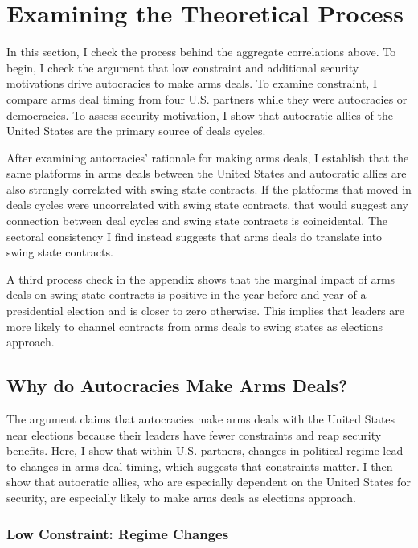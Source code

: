 \documentclass[12pt]{article}
\begin{document}
\section{Examining the Theoretical Process}


In this section, I check the process behind the aggregate correlations above.  
To begin, I check the argument that low constraint and additional security motivations drive autocracies to make arms deals.
To examine constraint, I compare arms deal timing from four U.S. partners while they were autocracies or democracies.
To assess security motivation, I show that autocratic allies of the United States are the primary source of deals cycles. 


After examining autocracies' rationale for making arms deals, I establish that the same platforms in arms deals between the United States and autocratic allies are also strongly correlated with swing state contracts.
If the platforms that moved in deals cycles were uncorrelated with swing state contracts, that would suggest any connection between deal cycles and swing state contracts is coincidental.
The sectoral consistency I find instead suggests that arms deals do translate into swing state contracts.


A third process check in the appendix shows that the marginal impact of arms deals on swing state contracts is positive in the year before and year of a presidential election and is closer to zero otherwise.
This implies that leaders are more likely to channel contracts from arms deals to swing states as elections approach. 



\subsection{Why do Autocracies Make Arms Deals?}


The argument claims that autocracies make arms deals with the United States near elections because their leaders have fewer constraints and reap security benefits. 
Here, I show that within U.S. partners, changes in political regime lead to changes in arms deal timing, which suggests that constraints matter. 
I then show that autocratic allies, who are especially dependent on the United States for security, are especially likely to make arms deals as elections approach.


\subsubsection{Low Constraint: Regime Changes}
\end{document}
